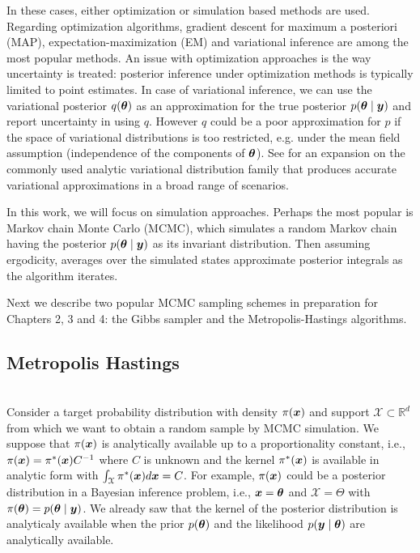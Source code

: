 In these cases, either optimization or simulation based methods are used. Regarding optimization algorithms, gradient descent for maximum a posteriori (MAP), expectation-maximization (EM) \citep{Rubin1977} and variational inference \citep{blei2017} are among the most popular methods. An issue with optimization approaches is the way uncertainty is treated: posterior inference under optimization methods is typically limited to point estimates. In case of variational inference, we can use the variational posterior $q(\mbox{\boldmath $\theta$})$ as an approximation for the true posterior $p(\mbox{\boldmath $\theta$} \mid \mbox{\boldmath $y$})$ and report uncertainty in using $q$. However $q$ could be a poor approximation for $p$ if the space of variational distributions is too restricted, e.g. under the mean field assumption (independence of the components of $\mbox{\boldmath $\theta$}$). See \cite{yin2018} for an expansion on the commonly used analytic variational distribution family that produces accurate variational approximations in a broad range of scenarios.

In this work, we will focus on simulation approaches. Perhaps the most popular is Markov chain Monte Carlo (MCMC), which simulates a random Markov chain having the posterior $p(\mbox{\boldmath $\theta$} \mid \mbox{\boldmath $y$})$ as its invariant distribution. Then assuming ergodicity, averages over the simulated states approximate posterior integrals as the algorithm iterates.

Next we describe two popular MCMC sampling schemes in preparation for Chapters 2, 3 and 4: the Gibbs sampler and the Metropolis-Hastings algorithms.

\subsection{Metropolis Hastings}\\

Consider a target probability distribution with density $\pi(\mbox{\boldmath $x$})$ and support $\mathcal{X} \subset \mathbb{R}^d$ from which we want to obtain a random sample by MCMC simulation. We suppose that $\pi(\mbox{\boldmath $x$})$ is analytically available up to a proportionality constant, i.e., $\pi(\mbox{\boldmath $x$}) = \pi^*(\mbox{\boldmath $x$}) C^{-1}$ where $C$ is unknown and the kernel $\pi^*(\mbox{\boldmath $x$})$ is available in analytic form with $\int_{\mathcal{X}} \pi^*(\mbox{\boldmath $x$}) d\mbox{\boldmath $x$} = C$. For example, $\pi(\mbox{\boldmath $x$})$ could be a posterior distribution in a Bayesian inference problem, i.e., $\mbox{\boldmath $x$} = \mbox{\boldmath $\theta$}$ and $\mathcal{X} = \Theta$ with $\pi(\mbox{\boldmath $\theta$}) = p(\mbox{\boldmath $\theta$} \mid \mbox{\boldmath $y$})$. We already saw that the kernel of the posterior distribution is analyticaly available when the prior $p(\mbox{\boldmath $\theta$})$ and the likelihood $p(\mbox{\boldmath $y$} \mid \mbox{\boldmath $\theta$})$ are analytically available.


